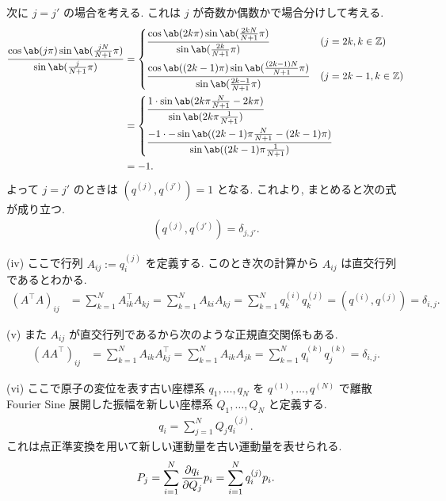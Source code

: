 \documentclass[uplatex,diffipdfmx,a4paper,11pt]{jlreq}
\newcommand{\ZZ}{\mathbb{Z}}
\theoremstyle{definition}
\begin{document}
次に $j = j'$ の場合を考える. これは $j$ が奇数か偶数かで場合分けして考える.
\begin{align}
  \frac{\cos\ab(j\pi)\sin\ab(\frac{jN}{N+1}\pi)}{\sin\ab(\frac{j}{N+1}\pi)} & =
  \begin{dcases}
    \frac{\cos\ab(2k\pi)\sin\ab(\frac{2kN}{N+1}\pi)}{\sin\ab(\frac{2k}{N+1}\pi)}           & (j = 2k, k\in\ZZ)   \\
    \frac{\cos\ab((2k-1)\pi)\sin\ab(\frac{(2k-1)N}{N+1}\pi)}{\sin\ab(\frac{2k-1}{N+1}\pi)} & (j = 2k-1, k\in\ZZ)
  \end{dcases} \\ & =
  \begin{dcases}
    \frac{1\cdot\sin\ab(2k\pi\frac{N}{N+1} - 2k\pi)}{\sin\ab(2k\pi\frac{1}{N+1})} \\
    \frac{-1 \cdot -\sin\ab((2k-1)\pi\frac{N}{N+1} - (2k-1)\pi)}{\sin\ab((2k-1)\pi\frac{1}{N+1})}
  \end{dcases}           \\
                                                                            & = -1.
\end{align}
よって $j = j'$ のときは $(q^{(j)}, q^{(j')}) = 1$ となる. これより, まとめると次の式が成り立つ.
\begin{align}
  (q^{(j)}, q^{(j')}) = \delta_{j,j'}.
\end{align}


(iv) ここで行列 $A_{ij} := q_i^{(j)}$ を定義する. このとき次の計算から $A_{ij}$ は直交行列であるとわかる.
\begin{align}
  (A^{\top}A)_{ij} & = \sum_{k=1}^{N}A_{ik}^\top A_{kj} = \sum_{k=1}^{N}A_{ki}A_{kj} = \sum_{k=1}^{N}q_k^{(i)}q_k^{(j)} = (q^{(i)}, q^{(j)}) = \delta_{i,j}.
\end{align}

(v) また $A_{ij}$ が直交行列であるから次のような正規直交関係もある.
\begin{align}
  (AA^{\top})_{ij} & = \sum_{k=1}^{N}A_{ik}A_{kj}^{\top} = \sum_{k=1}^{N}A_{ik}A_{jk} = \sum_{k=1}^{N}q_i^{(k)}q_j^{(k)} = \delta_{i,j}.
\end{align}

(vi) ここで原子の変位を表す古い座標系 $q_1, \ldots, q_N$ を $q^{(1)}, \ldots, q^{(N)}$ で離散 Fourier Sine 展開した振幅を新しい座標系 $Q_1, \ldots, Q_N$ と定義する.
\begin{align}
  q_i = \sum_{j=1}^{N}Q_jq_i^{(j)}.
\end{align}
これは点正準変換を用いて新しい運動量を古い運動量を表せられる.
\begin{align}
  P_j = \sum_{i=1}^{N}\diffp{q_i}{Q_j}p_i = \sum_{i=1}^{N}q_i^{(j)}p_i.
\end{align}
\end{document}
